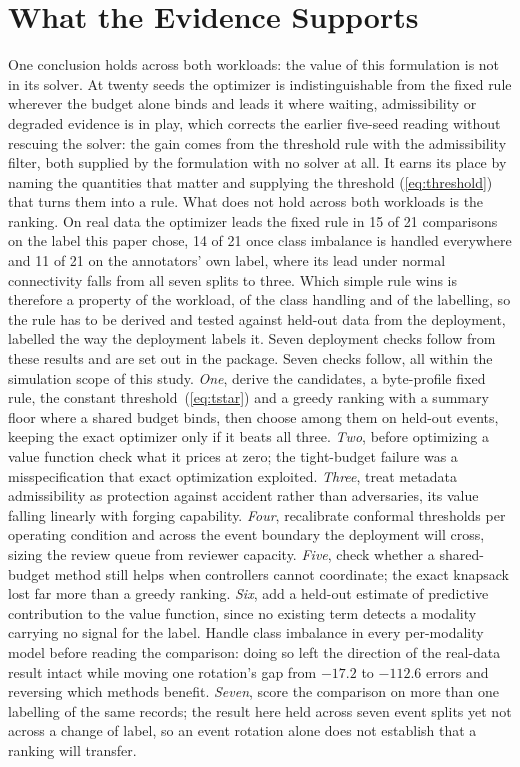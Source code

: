 \documentclass[conference,a4paper]{IEEEtran}
\newif\ifsubmission
\newcommand{\masteronly}[1]{\ifsubmission\else#1\fi}
\begin{document}
\section{What the Evidence Supports}
One conclusion holds across both workloads: the value of this formulation is not in its solver. At twenty seeds the optimizer is indistinguishable from the fixed rule wherever the budget alone binds and leads it where waiting, admissibility or degraded evidence is in play, which corrects the earlier five-seed reading without rescuing the solver: the gain comes from the threshold rule with the admissibility filter, both supplied by the formulation with no solver at all. \masteronly{It earns its place by naming the quantities that matter and supplying the threshold (\ref{eq:threshold}) that turns them into a rule. } What does not hold across both workloads is the ranking. On real data the optimizer leads the fixed rule in 15 of 21 comparisons on the label this paper chose, 14 of 21 once class imbalance is handled everywhere and 11 of 21 on the annotators' own label, where its lead under normal connectivity falls from all seven splits to three. Which simple rule wins is therefore a property of the workload, of the class handling and of the labelling, so the rule has to be derived and tested against held-out data from the deployment, labelled the way the deployment labels it. \ifsubmission Seven deployment checks follow from these results and are set out in the package.\else
Seven checks follow, all within the simulation scope of this study. \emph{One}, derive the
candidates, a byte-profile fixed rule, the constant threshold~(\ref{eq:tstar}) and a greedy
ranking with a summary floor where a shared budget binds, then choose among them on
held-out events, keeping the exact optimizer only if it beats all three. \emph{Two}, before
optimizing a value function check what it prices at zero; the tight-budget failure was a
misspecification that exact optimization exploited. \emph{Three}, treat metadata
admissibility as protection against accident rather than adversaries, its value falling
linearly with forging capability. \emph{Four}, recalibrate conformal thresholds per
operating condition and across the event boundary the deployment will cross, sizing the
review queue from reviewer capacity. \emph{Five}, check whether a shared-budget method
still helps when controllers cannot coordinate; the exact knapsack lost far more than a
greedy ranking. \emph{Six}, add a held-out estimate of predictive contribution to the value
function, since no existing term detects a modality carrying no signal for the label. Handle
class imbalance in every per-modality model before reading the comparison: doing so
left the direction of the real-data result intact while moving one rotation's gap from
$-17.2$ to $-112.6$ errors and reversing which methods benefit. \emph{Seven}, score the
comparison on more than one labelling of the same records; the result here held across
seven event splits yet not across a change of label, so an event rotation alone does not
establish that a ranking will transfer.
\end{document}
